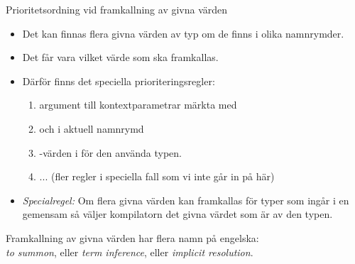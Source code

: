 \begin{Slide}{Prioritetsordning vid framkallning av givna värden}\SlideFontSmall
\begin{itemize}\SlideFontSmall
\item Det kan finnas flera  givna värden av  typ om de finns i olika namnrymder.
\item Det får  vara  vilket värde som ska framkallas.
\item Därför finns det speciella prioriteringsregler:
\begin{enumerate}\SlideFontTiny
\item {} argument till kontextparametrar märkta med 
\item {} och  i aktuell namnrymd  
\item {}-värden i  för den använda typen.
\item ... (fler regler i speciella fall som vi inte går in på här)
\end{enumerate}
\item \emph{Specialregel:} Om flera givna värden kan framkallas för typer som ingår i en gemensam  så väljer kompilatorn det givna värdet som är av den  typen.
\end{itemize}
Framkallning av givna värden har flera namn på engelska:\\ \emph{to summon}, eller \emph{term inference}, eller \emph{implicit resolution}. 
\end{Slide}

